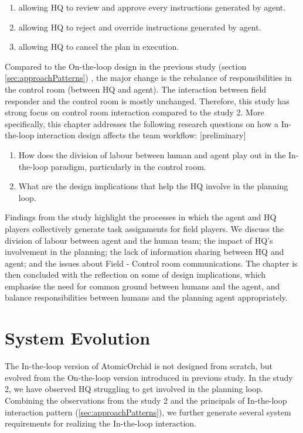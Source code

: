 \begin{enumerate}
	\item allowing HQ to review and approve every instructions generated by agent.
	\item allowing HQ to reject and override instructions generated by agent.
	\item allowing HQ to cancel the plan in execution. 
\end{enumerate}

Compared to the On-the-loop design in the previous study (section \ref{sec:approachPatterns}) , the major change is the rebalance of responsibilities in the control room (between HQ and agent). The interaction between field responder and the control room is mostly unchanged. Therefore, this study has strong focus on control room interaction compared to the study 2. More specifically, this chapter addresses the following research questions on how a In-the-loop interaction design affects the team workflow: [preliminary]\\

\begin{enumerate}
 \item How does the division of labour between human and agent play out in the In-the-loop paradigm, particularly in the control room.\\
 \item What are the design implications that help the HQ involve in the planning loop. 
\end{enumerate}

Findings from the study highlight the processes in which the agent and HQ players collectively generate task assignments for field players. We discuss the division of labour between agent and the human team; the impact of HQ's involvement in the planning; the lack of information sharing between HQ and agent; and the issues about Field - Control room communications. The chapter is then concluded with the reflection on some of design implications, which emphasise the need for common ground between humans and the agent, and balance responsibilities between humans and the planning agent appropriately.\\

\section{System Evolution}
The In-the-loop version of AtomicOrchid is not designed from scratch, but evolved from the On-the-loop version introduced in previous study. In the study 2, we have observed HQ struggling to get involved in the planning loop. Combining the observations from the study 2 and the principals of In-the-loop interaction pattern (\ref{sec:approachPatterns}), we further generate several system requirements for realizing the In-the-loop interaction. \\

